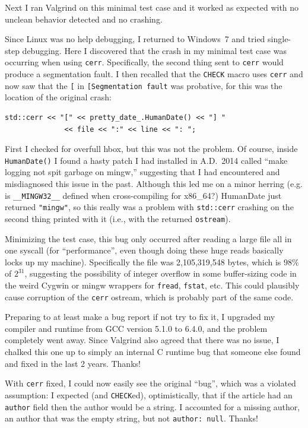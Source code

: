 \documentclass[twocolumn]{article}
\begin{document}
Next I ran Valgrind on this minimal test case and it worked as
expected with no unclean behavior detected and no crashing.

Since Linux was no help debugging, I returned to Windows~7 and tried
single-step debugging. Here I discovered that the crash in my minimal
test case was occurring when using \verb+cerr+. Specifically, the
second thing sent to \verb+cerr+ would produce a segmentation fault. I
then recalled that the \verb+CHECK+ macro uses \verb+cerr+ and now saw that
the \verb+[+ in \verb+[Segmentation fault+ was probative, for this
was the location of the original crash:
\begin{Verbatim}[fontsize=\small]
    std::cerr << "[" << pretty_date_.HumanDate() << "] "
              << file << ":" << line << ": ";
\end{Verbatim}

First I checked for overfull hbox, but this was not the problem.
Of course, inside \verb+HumanDate()+ I found a hasty patch I had
installed in A.D.~2014 called ``make logging not spit garbage on
mingw,'' suggesting that I had encountered and misdiagnosed this issue
in the past. Although this led me on a minor herring (e.g. is
\verb+__MINGW32__+ defined when cross-compiling for x86\_64?)
HumanDate just returned \verb+"mingw"+, so this really was a problem
with \verb+std::cerr+ crashing on the second thing printed with it
(i.e., with the returned \verb+ostream+).

Minimizing the test case, this bug only occurred after reading a large
file all in one syscall (for ``performance'', even though doing these
huge reads basically locks up my machine). Specifically the file was
2,105,319,548 bytes, which is $98\%$ of $2^{31}$, suggesting the
possibility of integer overflow in some buffer-sizing code in the
weird Cygwin or mingw wrappers for \verb+fread+, \verb+fstat+, etc.
This could plausibly cause corruption of the \verb+cerr+ ostream,
which is probably part of the same code.

Preparing to at least make a bug report if not try to fix it, I
upgraded my compiler and runtime from GCC version 5.1.0 to 6.4.0,
and the problem completely went away. Since Valgrind also agreed
that there was no issue, I chalked this one up to simply an internal
C runtime bug that someone else found and fixed in the last 2 years.
Thanks!

With \verb+cerr+ fixed, I could now easily see the original ``bug'',
which was a violated assumption: I expected (and \verb+CHECK+ed),
optimistically, that if the article had an {\tt author} field then the
author would be a string. I accounted for a missing author, an author
that was the empty string, but not \verb+author: null+. Thanks!
\end{document}
